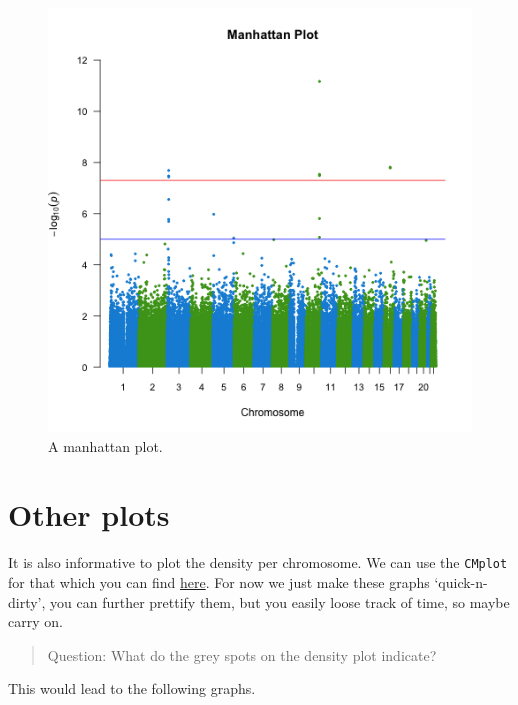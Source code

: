 \documentclass[
]{book}
\newcommand{\passthrough}[1]{#1}
\begin{document}
\begin{figure}[H]

{\centering \includegraphics[width=0.85\linewidth]{img/_gwas_dummy/show-manhattan} 

}

\caption{A manhattan plot.}\label{fig:showmanhattan}
\end{figure}

\hypertarget{other-plots}{%
\section{Other plots}\label{other-plots}}

It is also informative to plot the density per chromosome. We can use the \passthrough{\lstinline!CMplot!} for that which you can find \href{https://github.com/YinLiLin/R-CMplot}{here}. For now we just make these graphs `quick-n-dirty', you can further prettify them, but you easily loose track of time, so maybe carry on.

\begin{quote}
Question: What do the grey spots on the density plot indicate?
\end{quote}

This would lead to the following graphs.
\end{document}
